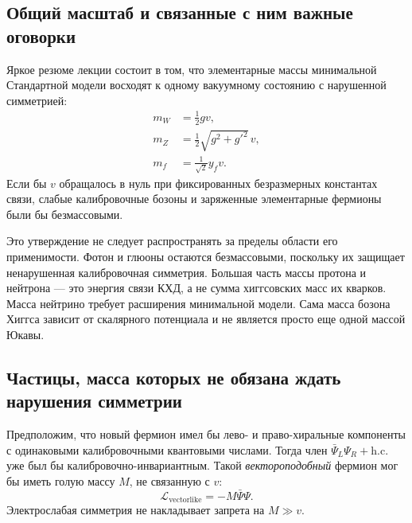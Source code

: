 \subsection{Общий масштаб и связанные с ним важные оговорки}

\begin{classroomqa}
\end{classroomqa}

Яркое резюме лекции состоит в том, что элементарные массы минимальной
Стандартной модели восходят к одному вакуумному состоянию с нарушенной симметрией:
\begin{align}
  m_W&=\frac12gv,\\
  m_Z&=\frac12\sqrt{g^2+g'^2}\,v,\\
  m_f&=\frac1{\sqrt2}y_fv.
  \label{eq:l09-electroweak-mass-summary}
\end{align}
Если бы \(v\) обращалось в нуль при фиксированных безразмерных константах связи,
слабые калибровочные бозоны и заряженные элементарные фермионы были бы безмассовыми.

Это утверждение не следует распространять за пределы области его применимости. Фотон и глюоны остаются безмассовыми, поскольку их защищает ненарушенная калибровочная симметрия. Большая часть массы протона и нейтрона — это энергия связи КХД, а не сумма хиггсовских масс их кварков. Масса нейтрино требует расширения минимальной модели. Сама масса бозона Хиггса зависит от скалярного потенциала и не является просто еще одной массой Юкавы.

\subsection{Частицы, масса которых не обязана ждать нарушения симметрии}

Предположим, что новый фермион имел бы лево- и право-хиральные компоненты с одинаковыми калибровочными квантовыми числами. Тогда член \(\bar\Psi_L\Psi_R+\mathrm{h.c.}\) уже был бы калибровочно-инвариантным. Такой \emph{вектороподобный} фермион мог бы иметь голую массу \(M\), не связанную с \(v\):
\begin{equation}
  \mathcal L_{\mathrm{vectorlike}}
  =-M\bar\Psi\Psi.
  \label{eq:l09-vectorlike-mass}
\end{equation}
Электрослабая симметрия не накладывает запрета на \(M\gg v\).

